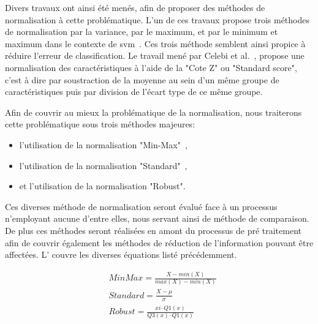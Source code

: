 \addtocounter{footnote}{1}

Divers travaux ont ainsi été menés, afin de proposer des méthodes de normalisation à cette problématique. L'un de ces travaux propose trois méthodes de normalisation par la variance, par le maximum, et par le minimum et maximum dans le contexte de \gls{svm}~\cite{Juszczak2002}. Ces trois méthode semblent ainsi propice à réduire l'erreur de classification. Le travail mené par Celebi et al.~\cite{Celebi2007}, propose une normalisation des caractéristiques à l'aide de la "Cote Z" ou "Standard score", c'est à dire par soustraction de la moyenne au sein d'un même groupe de caractéristiques puis par division de l'écart type de ce même groupe.\par

Afin de couvrir au mieux la problématique de la normalisation, nous traiterons cette problématique sous trois méthodes majeures:
\begin{itemize}
    \item l'utilisation de la normalisation "Min-Max"~\cite{Juszczak2002},
    \item l'utilisation de la normalisation "Standard"~\cite{Celebi2007}, 
    \item et l'utilisation de la normalisation "Robust". 
\end{itemize}
Ces diverses méthode de normalisation seront évalué face à un processus n'employant aucune d'entre elles, nous servant ainsi de méthode de comparaison. De plus ces méthodes seront réalisées en amont du processus de pré traitement afin de couvrir également les méthodes de réduction de l'information pouvant être affectées. L' couvre les diverses équations listé précédemment.\par

\begin{equation} 
    \label{eq:scaling_methods}
    \begin{split}
    &MinMax=\frac{X-min(X)}{max(X)-min(X)}  \\
    &Standard=\frac{X-\mu{}}{\sigma}	    \\
    &Robust=\frac{xi–Q1(x)}{Q3(x)–Q1(x)}    \\
    \end{split}
\end{equation}

